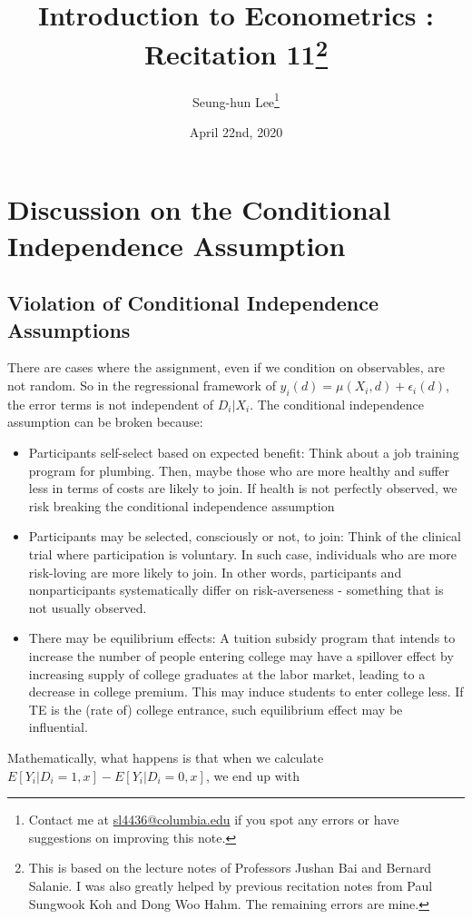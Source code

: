 \documentclass[12pt]{article}
\title{Introduction to Econometrics \ROM{2}: Recitation 11\footnote{This is based on the lecture notes of Professors Jushan Bai and Bernard Salanie. I was also greatly helped by previous recitation notes from Paul Sungwook Koh and Dong Woo Hahm. The remaining errors are mine. }}
\theoremstyle{definition}
\theoremstyle{property}
\theoremstyle{assumption}
\theoremstyle{example}
\theoremstyle{comment}
\begin{document}
\linespread{1.25}
\onehalfspacing

\author{Seung-hun Lee\footnote{Contact me at \href{mailto:sl4436@columbia.edu}{sl4436@columbia.edu} if you spot any errors or have suggestions on improving this note.}}
\date{April 22nd, 2020}
\maketitle
\thispagestyle{firstpage}

\section{Discussion on the Conditional Independence Assumption}
\subsection{Violation of Conditional Independence Assumptions}
There are cases where the assignment, even if we condition on observables, are not random. So in the regressional framework of $y_{i}(d)=\mu(X_i,d)+\epsilon_i(d)$, the error terms is not independent of $D_i|X_i$. The conditional independence assumption can be broken because:
\begin{itemize}
\item Participants self-select based on expected benefit: Think about a job training program for plumbing. Then, maybe those who are more healthy and suffer less in terms of costs are likely to join. If health is not perfectly observed, we risk breaking the conditional independence assumption
\item Participants may be selected, consciously or not, to join: Think of the clinical trial where participation is voluntary. In such case, individuals who are more risk-loving are more likely to join. In other words, participants and nonparticipants systematically differ on risk-averseness - something that is not usually observed.
\item There may be equilibrium effects: A tuition subsidy program that intends to increase the number of people entering college may have a spillover effect by increasing supply of college graduates at the labor market, leading to a decrease in college premium. This may induce students to enter college less. If TE is the (rate of) college entrance, such equilibrium effect may be influential.  
\end{itemize}
\par
Mathematically, what happens is that when we calculate $E[Y_i|D_i=1,x]-E[Y_i|D_i=0,x]$, we end up with
\end{document}

